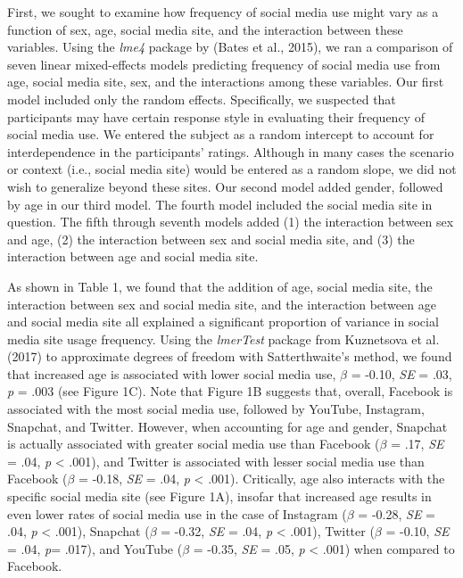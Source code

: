 \documentclass[man, fleqn, noextraspace]{apa6}
\theoremstyle{definition}
\theoremstyle{definition}
\theoremstyle{definition}
\theoremstyle{remark}
\begin{document}
First, we sought to examine how frequency of social media use might vary
as a function of sex, age, social media site, and the interaction
between these variables. Using the \emph{lme4} package by (Bates et al.,
2015), we ran a comparison of seven linear mixed-effects models
predicting frequency of social media use from age, social media site,
sex, and the interactions among these variables. Our first model
included only the random effects. Specifically, we suspected that
participants may have certain response style in evaluating their
frequency of social media use. We entered the subject as a random
intercept to account for interdependence in the participants' ratings.
Although in many cases the scenario or context (i.e., social media site)
would be entered as a random slope, we did not wish to generalize beyond
these sites. Our second model added gender, followed by age in our third
model. The fourth model included the social media site in question. The
fifth through seventh models added (1) the interaction between sex and
age, (2) the interaction between sex and social media site, and (3) the
interaction between age and social media site.

As shown in Table 1, we found that the addition of age, social media
site, the interaction between sex and social media site, and the
interaction between age and social media site all explained a
significant proportion of variance in social media site usage frequency.
Using the \emph{lmerTest} package from Kuznetsova et al. (2017) to
approximate degrees of freedom with Satterthwaite's method, we found
that increased age is associated with lower social media use, \(\beta\)
= -0.10, \emph{SE} = .03, \emph{p} = .003 (see Figure 1C). Note that
Figure 1B suggests that, overall, Facebook is associated with the most
social media use, followed by YouTube, Instagram, Snapchat, and Twitter.
However, when accounting for age and gender, Snapchat is actually
associated with greater social media use than Facebook (\(\beta\) = .17,
\emph{SE} = .04, \emph{p} \textless{} .001), and Twitter is associated
with lesser social media use than Facebook (\(\beta\) = -0.18, \emph{SE}
= .04, \emph{p} \textless{} .001). Critically, age also interacts with
the specific social media site (see Figure 1A), insofar that increased
age results in even lower rates of social media use in the case of
Instagram (\(\beta\) = -0.28, \emph{SE} = .04, \emph{p} \textless{}
.001), Snapchat (\(\beta\) = -0.32, \emph{SE} = .04, \emph{p}
\textless{} .001), Twitter (\(\beta\) = -0.10, \emph{SE} = .04,
\emph{p}= .017), and YouTube (\(\beta\) = -0.35, \emph{SE} = .05,
\emph{p} \textless{} .001) when compared to Facebook.
\end{document}
